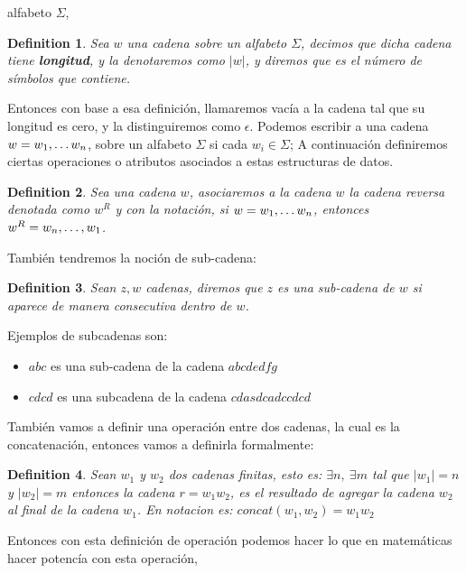 \documentclass[10pt]{report}
\newtheorem{definition}{Definition}
\begin{document}
    alfabeto $\Sigma$,\newline
    \begin{definition}
        Sea $w$ una cadena sobre un alfabeto $\Sigma$, decimos que dicha cadena tiene \textbf{longitud},
        y la denotaremos como $|w|$, y diremos que es el número de símbolos que contiene.

    \end{definition}
    Entonces con base a esa definición, llamaremos vacía a la cadena tal que su longitud es cero, y la
    distinguiremos como $\epsilon$.\newline
    Podemos escribir a una cadena $w = w_{1},\mathellipsis w_{n}$, sobre un alfabeto $\Sigma$ si cada $w_{i} \in \Sigma$;
    \space
    A continuación definiremos ciertas operaciones o atributos asociados a estas estructuras de datos.
    \begin{definition}
        Sea una cadena $w$, asociaremos a la cadena $w$ la cadena reversa denotada como $w^R$
        y con la notación, si $w = w_{1},\mathellipsis w_{n}$, entonces $w^{R} = w_{n},\mathellipsis,w_{1}$.
    \end{definition}
    También tendremos la noción de sub-cadena:\newline
    \begin{definition}
        Sean $z,w$ cadenas, diremos que $z$ es una sub-cadena de $w$ si aparece de manera consecutiva dentro de $w$.
    \end{definition}
    Ejemplos de subcadenas son:
    \begin{itemize}
        \item $abc$ es una sub-cadena de la cadena $abcdedfg$
        \item $cdcd$ es una subcadena de la cadena $cdasdcadccdcd$
    \end{itemize}
    También vamos a definir una operación entre dos cadenas, la cual es
    la concatenación, entonces vamos a definirla formalmente:\newline
    \begin{definition}
        Sean $w_{1}$ y $w_{2}$ dos cadenas finitas, esto es:\newline
        $\exists n,\ \exists m$ tal que $|w_{1}|=n$ y $|w_{2}|=m$
        entonces la cadena $r = w_{1}w_{2}$, es el resultado de agregar la cadena $w_{2}$ al final de la cadena
        $w_{1}$.\newline
        En notacion es: $concat(w_{1},w_{2}) = w_{1}w_{2}$
    \end{definition}
    Entonces con esta definición de operación podemos hacer lo que en matemáticas hacer potencía con esta operación,
\end{document}
